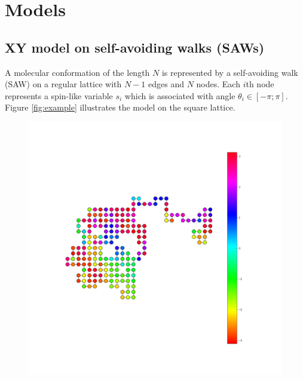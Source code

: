 \chapter{Models} 

\section{XY model on self-avoiding walks (SAWs)} \label{sec:xymodel}

A molecular conformation of the length $N$ is represented by a self-avoiding walk (SAW) on a regular lattice with $N-1$ edges and $N$ nodes.  Each $i$th node represents a spin-like variable $s_i$ which is associated with angle $\theta_i \in  [-\pi;\pi]$. Figure \ref{fig:example} illustrates the model on the square lattice. 

 \begin{figure}[H]
	\centering
	\includegraphics[scale=0.2]{Images/state_example.png}

\end{figure}
